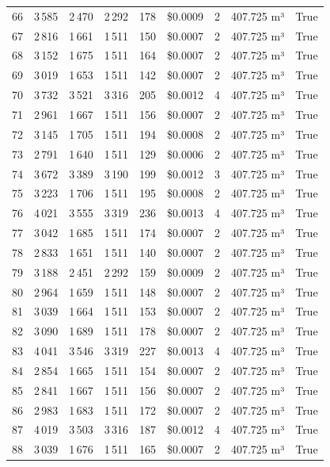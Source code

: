 \documentclass[a4paper,11pt]{article}
\begin{document}
\begin{table}[ht]
\begin{tabular}{r r r r r r r p{3cm} l}
66 & 3\,585 & 2\,470 & 2\,292 & 178 & \$0.0009 & 2 & 407.725 m³ & True \\
67 & 2\,816 & 1\,661 & 1\,511 & 150 & \$0.0007 & 2 & 407.725 m³ & True \\
68 & 3\,152 & 1\,675 & 1\,511 & 164 & \$0.0007 & 2 & 407.725 m³ & True \\
69 & 3\,019 & 1\,653 & 1\,511 & 142 & \$0.0007 & 2 & 407.725 m³ & True \\
70 & 3\,732 & 3\,521 & 3\,316 & 205 & \$0.0012 & 4 & 407.725 m³ & True \\
71 & 2\,961 & 1\,667 & 1\,511 & 156 & \$0.0007 & 2 & 407.725 m³ & True \\
72 & 3\,145 & 1\,705 & 1\,511 & 194 & \$0.0008 & 2 & 407.725 m³ & True \\
73 & 2\,791 & 1\,640 & 1\,511 & 129 & \$0.0006 & 2 & 407.725 m³ & True \\
74 & 3\,672 & 3\,389 & 3\,190 & 199 & \$0.0012 & 3 & 407.725 m³ & True \\
75 & 3\,223 & 1\,706 & 1\,511 & 195 & \$0.0008 & 2 & 407.725 m³ & True \\
76 & 4\,021 & 3\,555 & 3\,319 & 236 & \$0.0013 & 4 & 407.725 m³ & True \\
77 & 3\,042 & 1\,685 & 1\,511 & 174 & \$0.0007 & 2 & 407.725 m³ & True \\
78 & 2\,833 & 1\,651 & 1\,511 & 140 & \$0.0007 & 2 & 407.725 m³ & True \\
79 & 3\,188 & 2\,451 & 2\,292 & 159 & \$0.0009 & 2 & 407.725 m³ & True \\
80 & 2\,964 & 1\,659 & 1\,511 & 148 & \$0.0007 & 2 & 407.725 m³ & True \\
81 & 3\,039 & 1\,664 & 1\,511 & 153 & \$0.0007 & 2 & 407.725 m³ & True \\
82 & 3\,090 & 1\,689 & 1\,511 & 178 & \$0.0007 & 2 & 407.725 m³ & True \\
83 & 4\,041 & 3\,546 & 3\,319 & 227 & \$0.0013 & 4 & 407.725 m³ & True \\
84 & 2\,854 & 1\,665 & 1\,511 & 154 & \$0.0007 & 2 & 407.725 m³ & True \\
85 & 2\,841 & 1\,667 & 1\,511 & 156 & \$0.0007 & 2 & 407.725 m³ & True \\
86 & 2\,983 & 1\,683 & 1\,511 & 172 & \$0.0007 & 2 & 407.725 m³ & True \\
87 & 4\,019 & 3\,503 & 3\,316 & 187 & \$0.0012 & 4 & 407.725 m³ & True \\
88 & 3\,039 & 1\,676 & 1\,511 & 165 & \$0.0007 & 2 & 407.725 m³ & True \\

\end{tabular}
\end{table}
\end{document}
